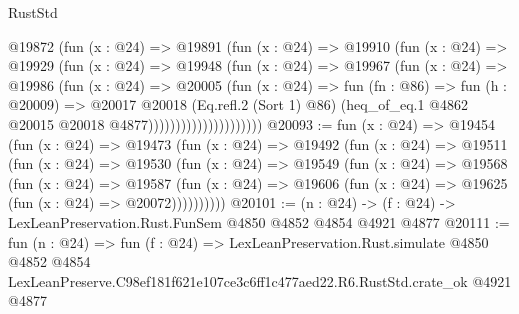 \begin{lexlean}{RustStd}
\begin{coremodule}
                          @19872
                            (fun (x : @24) =>
                            @19891
                              (fun (x : @24) =>
                              @19910
                                (fun (x : @24) =>
                                @19929
                                  (fun (x : @24) =>
                                  @19948
                                    (fun (x : @24) =>
                                    @19967
                                      (fun (x : @24) =>
                                      @19986
                                        (fun (x : @24) =>
                                        @20005
                                          (fun (x : @24) =>
                                          fun (fn : @86) =>
                                          fun (h : @20009) =>
                                          @20017
                                            @20018
                                            (Eq.refl.{2} (Sort 1) @86)
                                            (heq_of_eq.{1}
                                              @4862
                                              @20015
                                              @20018
                                              @4877)))))))))))))))))))))
@20093 := fun (x : @24) =>
  @19454
    (fun (x : @24) =>
    @19473
      (fun (x : @24) =>
      @19492
        (fun (x : @24) =>
        @19511
          (fun (x : @24) =>
          @19530
            (fun (x : @24) =>
            @19549
              (fun (x : @24) =>
              @19568
                (fun (x : @24) =>
                @19587
                  (fun (x : @24) =>
                  @19606 (fun (x : @24) => @19625 (fun (x : @24) => @20072))))))))))
@20101 := (n : @24) -> (f : @24) -> LexLeanPreservation.Rust.FunSem @4850 @4852 @4854 @4921 @4877
@20111 := fun (n : @24) =>
  fun (f : @24) =>
  LexLeanPreservation.Rust.simulate
    @4850
    @4852
    @4854
    LexLeanPreserve.C98ef181f621e107ce3c6ff1c477aed22.R6.RustStd.crate_ok
    @4921
    @4877
\end{coremodule}
\end{lexlean}
